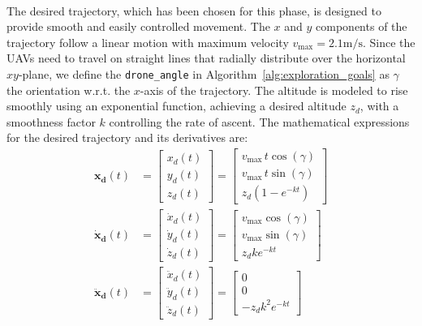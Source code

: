 \documentclass[main]{subfiles}
\begin{document}
\noindent\\
The desired trajectory, which has been chosen for this phase,
is designed to provide smooth and easily controlled movement. 
The \(x\) and \(y\) components of the trajectory follow 
a linear motion with maximum velocity \(v_{\text{max}} = 2.1 \text{m/s}\). 
Since the UAVs need to travel on straight lines that 
radially distribute over the horizontal $xy$-plane, we 
define the \texttt{drone\_angle} in Algorithm~\ref{alg:exploration_goals} as
\(\gamma \) the orientation w.r.t. the $x$-axis of the trajectory.
The altitude is modeled to rise smoothly 
using an exponential function, achieving a desired altitude \(z_d\), 
with a smoothness factor \(k\) controlling the rate of ascent. 
The mathematical expressions for the desired trajectory and 
its derivatives are:
\begin{equation}
\begin{aligned}
\mathbf{x_d}(t) &= 
\begin{bmatrix}
x_d(t) \\ y_d(t) \\ z_d(t)
\end{bmatrix}
=
\begin{bmatrix}
v_{\text{max}} \, t \cos(\gamma) \\
v_{\text{max}} \, t \sin(\gamma) \\
z_d \left(1 - e^{-k t}\right)
\end{bmatrix} \\[10pt]
\mathbf{\dot{x}_d}(t) &= 
\begin{bmatrix}
\dot{x}_d(t) \\ \dot{y}_d(t) \\ \dot{z}_d(t)
\end{bmatrix}
=
\begin{bmatrix}
v_{\text{max}} \cos(\gamma) \\
v_{\text{max}} \sin(\gamma) \\
z_d k e^{-k t}
\end{bmatrix} \\[10pt]
\mathbf{\ddot{x}_d}(t) &= 
\begin{bmatrix}
\ddot{x}_d(t) \\ \ddot{y}_d(t) \\ \ddot{z}_d(t)
\end{bmatrix}
=
\begin{bmatrix}
0 \\
0 \\
-z_d k^2 e^{-k t}
\end{bmatrix}
\end{aligned}
\end{equation}
    
\end{document}
